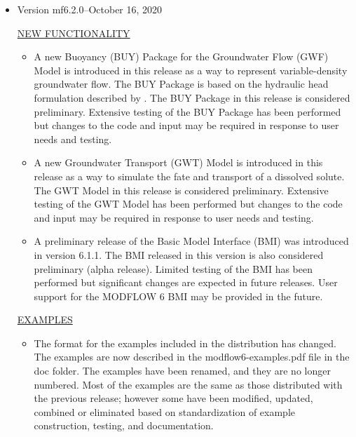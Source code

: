 \documentclass[11pt,twoside,twocolumn]{usgsreport}
\begin{document}
\begin{itemize}
	\item Version mf6.2.0--October 16, 2020

	\underline{NEW FUNCTIONALITY}
	\begin{itemize}
	        \item A new Buoyancy (BUY) Package for the Groundwater Flow (GWF) Model is introduced in this release as a way to represent variable-density groundwater flow.  The BUY Package is based on the hydraulic head formulation described by \cite{langevin2020hydraulic}.  The BUY Package in this release is considered preliminary.  Extensive testing of the BUY Package has been performed but changes to the code and input may be required in response to user needs and testing.   
		\item A new Groundwater Transport (GWT) Model is introduced in this release as a way to simulate the fate and transport of a dissolved solute.  The GWT Model in this release is considered preliminary.  Extensive testing of the GWT Model has been performed but changes to the code and input may be required in response to user needs and testing. 
		\item A preliminary release of the Basic Model Interface (BMI) was introduced in version 6.1.1.  The BMI released in this version is also considered preliminary (alpha release).  Limited testing of the BMI has been performed but significant changes are expected in future releases.  User support for the MODFLOW 6 BMI may be provided in the future.
	\end{itemize}
	
	\underline{EXAMPLES}
	\begin{itemize}
	\item The format for the examples included in the distribution has changed.  The examples are now described in the modflow6-examples.pdf file in the doc folder.  The examples have been renamed, and they are no longer numbered.  Most of the examples are the same as those distributed with the previous release; however some have been modified, updated, combined or eliminated based on standardization of example construction, testing, and documentation.  
	\end{itemize}


\end{itemize}
\end{document}

